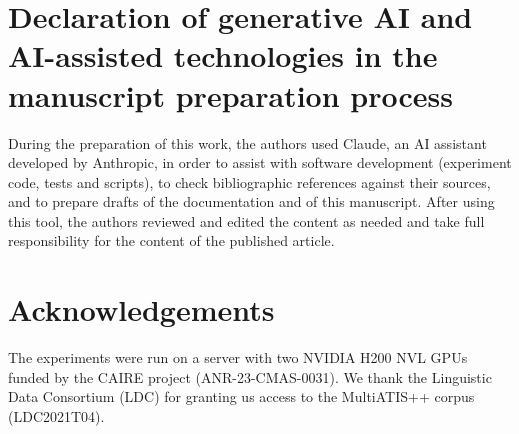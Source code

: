 \printcredits

\section*{Declaration of generative AI and AI-assisted technologies in the manuscript preparation process}

During the preparation of this work, the authors used Claude, an AI assistant developed by Anthropic, in order to assist with software development (experiment code, tests and scripts), to check bibliographic references against their sources, and to prepare drafts of the documentation and of this manuscript. After using this tool, the authors reviewed and edited the content as needed and take full responsibility for the content of the published article.

\section*{Acknowledgements}

The experiments were run on a server with two NVIDIA H200 NVL GPUs funded by the CAIRE project (ANR-23-CMAS-0031).
We thank the Linguistic Data Consortium (LDC) for granting us access to the MultiATIS++ corpus (LDC2021T04).

